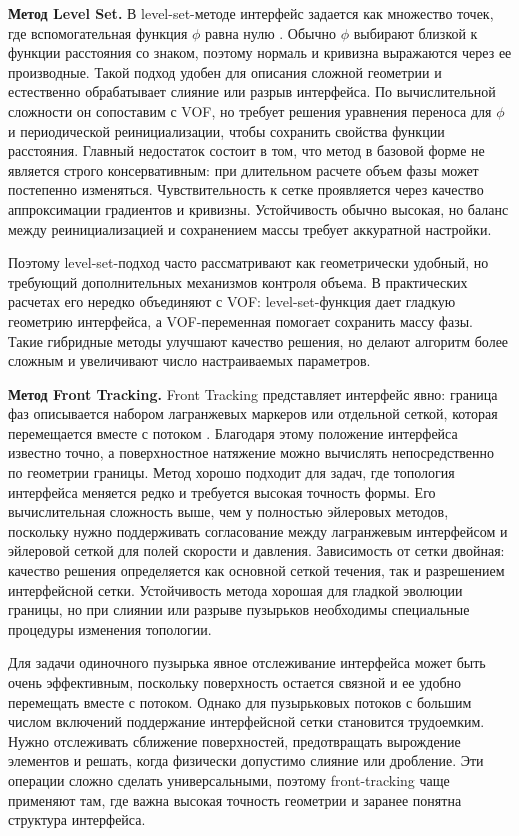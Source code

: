 \documentclass[12pt,a4paper]{article}
\begin{document}
\textbf{Метод Level Set.}
В level-set-методе интерфейс задается как множество точек, где вспомогательная
функция \(\phi\) равна нулю \cite{Osher1988}. Обычно \(\phi\) выбирают близкой
к функции расстояния со знаком, поэтому нормаль и кривизна выражаются через ее
производные. Такой подход удобен для описания сложной геометрии и естественно
обрабатывает слияние или разрыв интерфейса. По вычислительной сложности он
сопоставим с VOF, но требует решения уравнения переноса для \(\phi\) и
периодической реинициализации, чтобы сохранить свойства функции расстояния.
Главный недостаток состоит в том, что метод в базовой форме не является строго
консервативным: при длительном расчете объем фазы может постепенно изменяться.
Чувствительность к сетке проявляется через качество аппроксимации градиентов и
кривизны. Устойчивость обычно высокая, но баланс между реинициализацией и
сохранением массы требует аккуратной настройки.

Поэтому level-set-подход часто рассматривают как геометрически удобный, но
требующий дополнительных механизмов контроля объема. В практических расчетах
его нередко объединяют с VOF: level-set-функция дает гладкую геометрию
интерфейса, а VOF-переменная помогает сохранить массу фазы. Такие гибридные
методы улучшают качество решения, но делают алгоритм более сложным и
увеличивают число настраиваемых параметров.

\textbf{Метод Front Tracking.}
Front Tracking представляет интерфейс явно: граница фаз описывается набором
лагранжевых маркеров или отдельной сеткой, которая перемещается вместе с
потоком \cite{Tryggvason2001}. Благодаря этому положение интерфейса известно
точно, а поверхностное натяжение можно вычислять непосредственно по геометрии
границы. Метод хорошо подходит для задач, где топология интерфейса меняется
редко и требуется высокая точность формы. Его вычислительная сложность выше,
чем у полностью эйлеровых методов, поскольку нужно поддерживать согласование
между лагранжевым интерфейсом и эйлеровой сеткой для полей скорости и давления.
Зависимость от сетки двойная: качество решения определяется как основной
сеткой течения, так и разрешением интерфейсной сетки. Устойчивость метода
хорошая для гладкой эволюции границы, но при слиянии или разрыве пузырьков
необходимы специальные процедуры изменения топологии.

Для задачи одиночного пузырька явное отслеживание интерфейса может быть очень
эффективным, поскольку поверхность остается связной и ее удобно перемещать
вместе с потоком. Однако для пузырьковых потоков с большим числом включений
поддержание интерфейсной сетки становится трудоемким. Нужно отслеживать
сближение поверхностей, предотвращать вырождение элементов и решать, когда
физически допустимо слияние или дробление. Эти операции сложно сделать
универсальными, поэтому front-tracking чаще применяют там, где важна высокая
точность геометрии и заранее понятна структура интерфейса.
\end{document}
